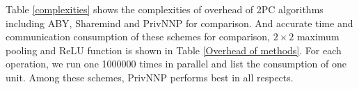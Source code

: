 \documentclass[letterpaper]{article} %
\begin{document}
    \begin{table}[!ht]

        \caption{Overhead of 2PC schemes for different tasks ($32$-bits input vlaue and $\kappa=128$ )}
        \label{Overhead of methods}
    \end{table}
    Table \ref{complexities} shows the complexities of
    overhead of 2PC algorithms including
    ABY, Sharemind and PrivNNP
    for comparison.
    And accurate time and communication consumption of these schemes for
     comparison, $2\times 2$ maximum pooling
    and ReLU function is shown in Table \ref{Overhead of methods}.
    For each operation, we run one 1000000 times in parallel and
    list the consumption of one unit.
    Among these schemes, PrivNNP performs best in all respects.
\end{document}
